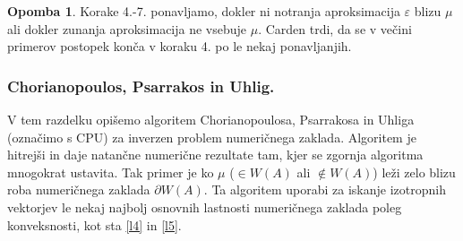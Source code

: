 \documentclass[12pt,a4paper]{amsart}
\theoremstyle{definition}
\newtheorem{opomba}[definicija]{Opomba}
\theoremstyle{plain}
\begin{document}
\begin{opomba}
Korake 4.-7. ponavljamo, dokler ni notranja aproksimacija $\varepsilon$ blizu $\mu$ ali dokler zunanja aproksimacija ne vsebuje $\mu$. Carden trdi, da se v večini primerov postopek konča v koraku 4. po le nekaj ponavljanjih.\\
\end{opomba}
\subsubsection{Chorianopoulos, Psarrakos in Uhlig.}
V tem razdelku opišemo algoritem Chorianopoulosa, Psarrakosa in Uhliga (označimo s CPU) za inverzen problem numeričnega zaklada.
Algoritem je hitrejši in daje natančne numerične rezultate tam, kjer se zgornja algoritma mnogokrat ustavita. Tak primer je ko $\mu$ ($\in W(A)$ ali $\not\in W(A)$) leži zelo blizu roba numeričnega zaklada $\partial W(A)$. Ta algoritem uporabi za iskanje izotropnih vektorjev le nekaj najbolj osnovnih lastnosti numeričnega zaklada poleg konveksnosti, kot sta \ref{l4} in \ref{l5}.\\
\end{document}
